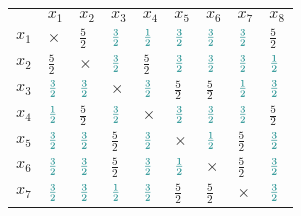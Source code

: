 \documentclass[12pt]{article}
\begin{document}
\begin{enumerate}[leftmargin=\labelsep]
  \begin{table}[h]
    \setlength{\tabcolsep}{5pt} %
    \renewcommand{\arraystretch}{1.35} %
    \centering
    \label{tab:my-table}
    \begin{tabular}{lllllllll}
          & $x_1$                           & $x_2$                           & $x_3$                           & $x_4$                           & $x_5$                           & $x_6$                           & $x_7$                           & $x_8$                           \\
    $x_1$ & $\times$                        & $\frac{5}{2}$                   & $\textcolor{teal}{\frac{3}{2}}$ & $\textcolor{teal}{\frac{1}{2}}$ & $\textcolor{teal}{\frac{3}{2}}$ & $\textcolor{teal}{\frac{3}{2}}$ & $\textcolor{teal}{\frac{3}{2}}$ & $\frac{5}{2}$                   \\
    $x_2$ & $\frac{5}{2}$                   & $\times$                        & $\textcolor{teal}{\frac{3}{2}}$ & $\frac{5}{2}$                   & $\textcolor{teal}{\frac{3}{2}}$ & $\textcolor{teal}{\frac{3}{2}}$ & $\textcolor{teal}{\frac{3}{2}}$ & $\textcolor{teal}{\frac{1}{2}}$ \\
    $x_3$ & $\textcolor{teal}{\frac{3}{2}}$ & $\textcolor{teal}{\frac{3}{2}}$ & $\times$                        & $\textcolor{teal}{\frac{3}{2}}$ & $\frac{5}{2}$                   & $\frac{5}{2}$                   & $\textcolor{teal}{\frac{1}{2}}$ & $\textcolor{teal}{\frac{3}{2}}$ \\
    $x_4$ & $\textcolor{teal}{\frac{1}{2}}$ & $\frac{5}{2}$                   & $\textcolor{teal}{\frac{3}{2}}$ & $\times$                        & $\textcolor{teal}{\frac{3}{2}}$ & $\textcolor{teal}{\frac{3}{2}}$ & $\textcolor{teal}{\frac{3}{2}}$ & $\frac{5}{2}$                   \\
    $x_5$ & $\textcolor{teal}{\frac{3}{2}}$ & $\textcolor{teal}{\frac{3}{2}}$ & $\frac{5}{2}$                   & $\textcolor{teal}{\frac{3}{2}}$ & $\times$                        & $\textcolor{teal}{\frac{1}{2}}$ & $\frac{5}{2}$                   & $\textcolor{teal}{\frac{3}{2}}$ \\
    $x_6$ & $\textcolor{teal}{\frac{3}{2}}$ & $\textcolor{teal}{\frac{3}{2}}$ & $\frac{5}{2}$                   & $\textcolor{teal}{\frac{3}{2}}$ & $\textcolor{teal}{\frac{1}{2}}$ & $\times$                        & $\frac{5}{2}$                   & $\textcolor{teal}{\frac{3}{2}}$ \\
    $x_7$ & $\textcolor{teal}{\frac{3}{2}}$ & $\textcolor{teal}{\frac{3}{2}}$ & $\textcolor{teal}{\frac{1}{2}}$ & $\textcolor{teal}{\frac{3}{2}}$ & $\frac{5}{2}$                   & $\frac{5}{2}$                   & $\times$                        & $\textcolor{teal}{\frac{3}{2}}$ \\

\end{tabular}
\end{table}
\end{enumerate}
\end{document}
